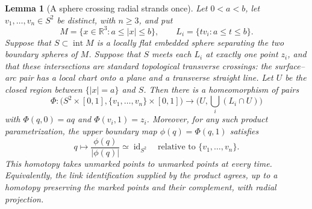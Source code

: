 \documentclass[11pt]{article}
\numberwithin{equation}{section}
\newtheorem{lemma}[theorem]{Lemma}
\theoremstyle{definition}
\theoremstyle{remark}
\begin{document}
\begin{lemma}[A sphere crossing radial strands once]\label{lt:punctured-product}\label{lt:ray-product}
Let $0<a<b$, let $v_1,\ldots,v_n\in S^2$ be distinct, with $n\geq3$, and put
\[
 M=\{x\in\mathbb R^3:a\leq |x|\leq b\},\qquad
 L_i=\{t v_i:a\leq t\leq b\}.
\]
Suppose that $S\subset\operatorname{int}M$ is a locally flat embedded
sphere separating the two boundary spheres of $M$.  Suppose that $S$
meets each $L_i$ at exactly one point $z_i$, and that these intersections
are standard topological transverse crossings: the surface--arc pair
has a local chart onto a plane and a transverse straight line.
Let $U$ be the closed region between $\{|x|=a\}$ and $S$.
Then there is a homeomorphism of pairs
\[
 \Phi:\bigl(S^2\times[0,1],\{v_1,\ldots,v_n\}\times[0,1]\bigr)
 \longrightarrow
 \bigl(U,\textstyle\bigcup_i(L_i\cap U)\bigr)
\]
with $\Phi(q,0)=a q$ and $\Phi(v_i,1)=z_i$.
Moreover, for any such product parametrization, the upper boundary map
$\phi(q)=\Phi(q,1)$ satisfies
\[
 q\longmapsto \frac{\phi(q)}{|\phi(q)|}\simeq\operatorname{id}_{S^2}
 \quad\text{relative to }\{v_1,\ldots,v_n\}.
\]
This homotopy takes unmarked points to unmarked points at every time.
Equivalently, the link identification supplied by the product agrees,
up to a homotopy preserving the marked points and their complement,
with radial projection.
\end{lemma}
\end{document}
